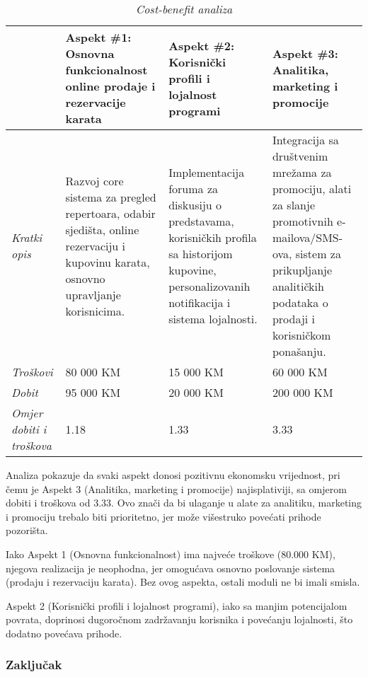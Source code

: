 \begin{table}[!htb]
    \centering
    \begin{tabular}{m{2cm}|m{4cm}|m{4cm}|m{4cm}}
         & \textbf{Aspekt \#1: Osnovna funkcionalnost online prodaje i rezervacije karata} & \textbf{Aspekt \#2: Korisnički profili i lojalnost programi} & \textbf{Aspekt \#3: Analitika, marketing i promocije}\\
         \hline
         \textit{Kratki opis}& Razvoj core sistema za pregled repertoara, odabir sjedišta, online rezervaciju i kupovinu karata, osnovno upravljanje korisnicima. & Implementacija foruma za diskusiju o predstavama, korisničkih profila sa historijom kupovine, personalizovanih notifikacija i sistema lojalnosti. & Integracija sa društvenim mrežama za promociju, alati za slanje promotivnih e-mailova/SMS-ova, sistem za prikupljanje analitičkih podataka o prodaji i korisničkom ponašanju.\\ \hline
         \textit{Troškovi} & 80 000 KM & 15 000 KM & 60 000 KM\\ \hline
         \textit{Dobit} & 95 000 KM & 20 000 KM & 200 000 KM\\ \hline
         \textit{Omjer dobiti i troškova} & 1.18 & 1.33 & 3.33\\
    \end{tabular}
    \caption{ \textit{Cost-benefit analiza}}
    \label{tab:finogr}
\end{table}

Analiza pokazuje da svaki aspekt donosi pozitivnu ekonomsku vrijednost, pri čemu je Aspekt 3 (Analitika, marketing i promocije) najisplativiji, sa omjerom dobiti i troškova od 3.33. Ovo znači da bi ulaganje u alate za analitiku, marketing i promociju trebalo biti prioritetno, jer može višestruko povećati prihode pozorišta.

Iako Aspekt 1 (Osnovna funkcionalnost) ima najveće troškove (80.000 KM), njegova realizacija je neophodna, jer omogućava osnovno poslovanje sistema (prodaju i rezervaciju karata). Bez ovog aspekta, ostali moduli ne bi imali smisla.

Aspekt 2 (Korisnički profili i lojalnost programi), iako sa manjim potencijalom povrata, doprinosi dugoročnom zadržavanju korisnika i povećanju lojalnosti, što dodatno povećava prihode.

\subsubsection{Zaključak}

